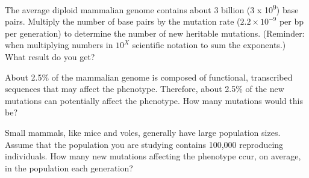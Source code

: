 \documentclass[11pt, addpoints]{exam}
\begin{document}
\begin{questions}

\question
\label{itm:kumar} The average diploid mammalian genome contains about 3
billion (3 x 10\textsuperscript{9}) base pairs. Multiply the number of
base pairs by the mutation rate ($2.2 \times 10^{-9}$ per bp per
generation) to determine the number of new heritable mutations.
(Reminder: when multiplying numbers in $10^X$ scientific
notation to sum the exponents.) What result do you get?%

\ifprintanswers{}
\else
\fi


\question
About 2.5\% of the mammalian genome is composed of
functional, transcribed sequences that may affect the phenotype.
Therefore, about 2.5\% of the new mutations can potentially affect the
phenotype. How many mutations would this be?

\ifprintanswers\vspace*{\baselineskip}{\bfseries%
	$6.6 \times 0.025 = 0.165$ mutations may affect the phenotype.}
\else
\fi


\question 
Small mammals, like mice and voles, generally have large
population sizes. Assume that the population you are studying contains
100,000 reproducing individuals. How many new mutations affecting the phenotype ccur, on
average, in the population each generation?

\ifprintanswers\vspace*{\baselineskip}{\bfseries%
	$100,000 \times 0.165 = 16,500$ new mutations per generation in the population.}
\else
\fi


\end{questions}
\end{document}

